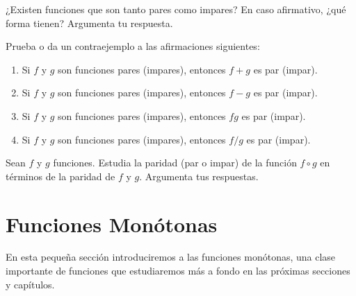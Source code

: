 \documentclass[12pt,a4paper]{book}
\begin{document}
    \begin{ejercicio}\label{ej:100}
        ¿Existen funciones que son tanto pares como impares? En
        caso afirmativo, ¿qué forma tienen? Argumenta tu respuesta.
    \end{ejercicio}

    \begin{ejercicio}\label{ej:101}
        Prueba o da un contraejemplo a las afirmaciones siguientes:
        \begin{enumerate}[nosep]
            \item Si $f$ y $g$ son funciones pares (impares), entonces $f+g$ es par (impar).
            \item Si $f$ y $g$ son funciones pares (impares), entonces $f-g$ es par (impar).
            \item Si $f$ y $g$ son funciones pares (impares), entonces $fg$ es par (impar).
            \item Si $f$ y $g$ son funciones pares (impares), entonces $f/g$ es par (impar).
        \end{enumerate}
    \end{ejercicio}

    \begin{ejercicio}\label{ej:102}
        Sean $f$ y $g$ funciones. Estudia la paridad (par o impar) de la
        función $f\circ g$ en términos de la paridad de $f$ y $g$. Argumenta tus respuestas.
    \end{ejercicio}

    \section{Funciones Monótonas}

    En esta pequeña sección introduciremos a las funciones monótonas, una
    clase importante de funciones que estudiaremos más a fondo en las próximas
    secciones y capítulos.
\end{document}
